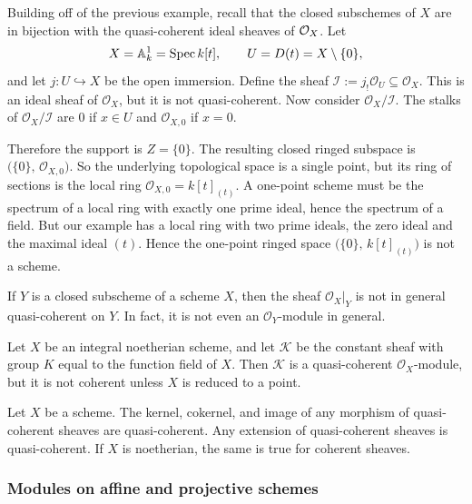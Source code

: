 \documentclass[12pt]{article}
\begin{document}
\begin{example}
    Building off of the previous example, recall that the closed subschemes of $X$ are in bijection with the quasi-coherent ideal sheaves of ${\mathcal{O}}_X$. Let
    \[
        X=\mathbb A^1_k=\operatorname{Spec} k[t],\qquad U=D(t)=X\setminus\{0\},
    \]
    and let $j:U\hookrightarrow X$ be the open immersion. Define the sheaf $\mathcal I:=j_!\mathcal O_U \subseteq \mathcal O_X$. This is an ideal sheaf of $\mathcal O_X$, but it is not quasi-coherent. Now consider $\mathcal O_X/\mathcal I$. The stalks of $\mathcal O_X/\mathcal I$ are $0$ if $x\in U$ and $\mathcal O_{X,0}$ if $x=0$.

    Therefore the support is $Z=\{0\}$. The resulting closed ringed subspace is
    $\bigl(\{0\},\,\mathcal O_{X,0}\bigr)$. So the underlying topological space is a single point, but its ring of sections is the local ring $\mathcal O_{X,0}=k[t]_{(t)}$. A one-point scheme must be the spectrum of a local ring with exactly one prime ideal, hence the spectrum of a field. But our example has a local ring with two prime ideals, the zero ideal and the maximal ideal $(t)$. Hence the one-point ringed space $\bigl(\{0\},\,k[t]_{(t)}\bigr)$ is not a scheme.
\end{example}

\begin{example}
    If $Y$ is a closed subscheme of a scheme $X$, then the sheaf $\mathcal{O}_X|_Y$ is not in general quasi-coherent on $Y$. In fact, it is not even an $\mathcal{O}_Y$-module in general.
\end{example}

\begin{example}
    Let $X$ be an integral noetherian scheme, and let $\mathcal{K}$ be the constant sheaf with group $K$ equal to the function field of $X$. Then $\mathcal{K}$ is a quasi-coherent $\mathcal{O}_X$-module, but it is not coherent unless $X$ is reduced to a point.
\end{example}

\begin{proposition}
    Let $X$ be a scheme. The kernel, cokernel, and image of any morphism of quasi-coherent sheaves are quasi-coherent. Any extension of quasi-coherent sheaves is quasi-coherent. If $X$ is noetherian, the same is true for coherent sheaves.
\end{proposition}

\subsubsection{Modules on affine and projective schemes}
\end{document}
